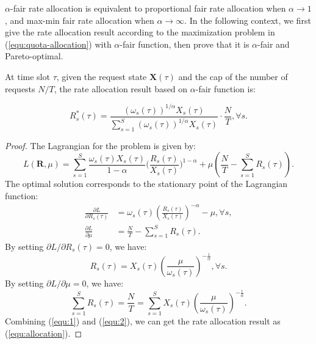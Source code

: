 $\alpha$-fair rate allocation is equivalent to proportional fair rate allocation when $\alpha \rightarrow 1$, and max-min fair rate allocation when $\alpha \rightarrow \infty$. In the following context, we first give the rate allocation result according to the maximization problem in (\ref{equ:quota-allocation}) with $\alpha$-fair function, then prove that it is $\alpha$-fair and Pareto-optimal. 
	
	\begin{proposition}\label{the:rate}
		At time slot $\tau$, given the request state $\pmb{X}(\tau)$ and the cap of the number of requests  $N/T$, the rate allocation result based on $\alpha$-fair function is:
		
		\begin{equation}\label{equ:allocation}
		R_s^*(\tau) = \frac{(\omega_s(\tau))^{1/\alpha} X_s(\tau) }{\sum_{s=1}^S (\omega_s(\tau))^{1/\alpha} X_s(\tau)}\cdot\frac{N}{T}, \forall s. 
		\end{equation} 
	\end{proposition}
	
	\begin{proof}
		The Lagrangian for the problem is given by:  
		\begin{displaymath}
		L(\pmb{R}, \mu) = \sum_{s=1}^S \frac{\omega_s(\tau) X_s(\tau)}{1-\alpha}\big(\frac{R_s(\tau)}{X_s(\tau)}\big)^{1-\alpha} + \mu(\frac{N}{T}-\sum_{s=1}^S R_s(\tau)).
		\end{displaymath}
		The optimal solution corresponds to the stationary point of the Lagrangian function:
		\begin{equation}\label{equ:la}
		\begin{split}
		\frac{\partial L}{\partial R_s(\tau)} &= \omega_s(\tau)(\frac{R_s(\tau)}{X_s(\tau)})^{-\alpha} - \mu, \forall s,\\
		\frac{\partial L}{\partial \mu}& = \frac{N}{T} -\sum_{s=1}^{S} R_s(\tau).
		\end{split}
		\end{equation}
		By setting $\partial L /\partial R_s(\tau) = 0$, we have:
		\begin{equation}\label{equ:1}
		R_s(\tau) = X_s(\tau) (\frac{\mu}{\omega_s(\tau)})^{-\frac{1}{\alpha}}, \forall s.
		\end{equation}
		By setting $\partial L /\partial \mu = 0$, we have:
		\begin{equation}\label{equ:2}
		\sum_{s=1}^SR_s(\tau) = \frac{N}{T} = \sum_{s=1}^SX_s(\tau) (\frac{\mu}{\omega_s(\tau)})^{-\frac{1}{\alpha}}.
		\end{equation}
		Combining (\ref{equ:1}) and (\ref{equ:2}), we can get the rate allocation result as (\ref{equ:allocation}). 
	\end{proof}
	
